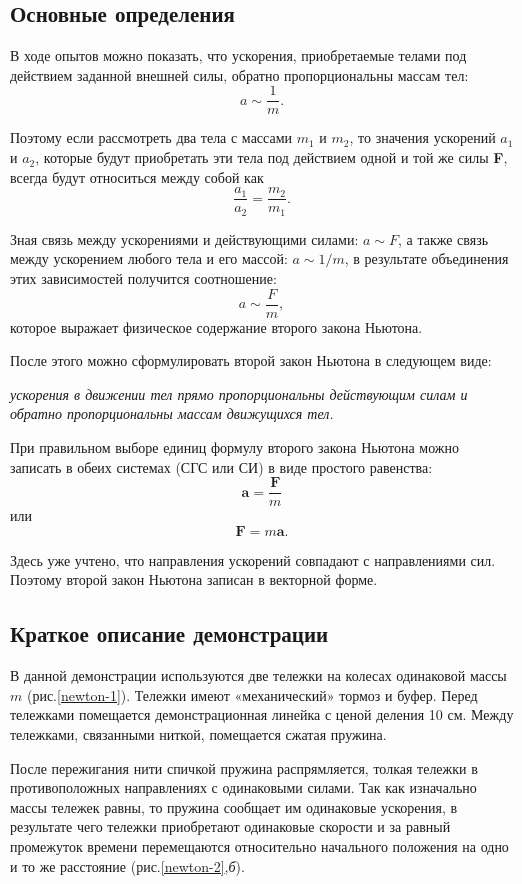 \documentclass[All.tex]{subfiles}
\begin{document}
\subsection*{\textcolor{PineGreen}{Основные определения}}

В ходе опытов можно показать, что ускорения, приобретаемые телами под действием заданной внешней силы, обратно пропорциональны массам тел: 
$$
a \sim \frac{1}{m}.
$$

Поэтому если рассмотреть два тела с массами $ m_1 $ и $ m_2 $, то значения ускорений $ a_1 $ и $ a_2 $, которые будут приобретать эти тела под действием одной и той же силы \textbf{F}, всегда будут относиться между собой как
$$
\frac{a_1}{a_2} = \frac{m_2}{m_1}.
$$

Зная связь между ускорениями и действующими силами: $ a \sim F $, а также связь между ускорением любого тела и его массой: $ a \sim 1/m$, в результате объединения этих зависимостей получится соотношение:
$$
a \sim \frac{F}{m},
$$
которое выражает физическое содержание второго закона Ньютона. 

После этого можно сформулировать второй закон Ньютона в 
следующем виде: 

\begin{flushleft}
	\textit{ускорения в движении тел прямо пропорциональны действующим 
силам и обратно пропорциональны массам движущихся тел. }
\end{flushleft}

При правильном выборе единиц формулу второго закона Ньютона 
можно записать в обеих системах (СГС или СИ) в виде простого равенства:
$$
 \textbf{a} = \frac{\textbf{F}}{m}
$$
 или
$$
\textbf{F} = m\textbf{a}.
$$
 
Здесь уже учтено, что направления ускорений совпадают с направлениями сил.
Поэтому второй закон Ньютона записан в векторной форме.

\subsection*{\textcolor{PineGreen}{Краткое описание демонстрации}}

В данной демонстрации используются две тележки на колесах одинаковой массы $m$ (рис.\ref{newton-1}).
Тележки имеют «механический» тормоз и буфер.
Перед тележками помещается демонстрационная линейка с ценой деления 10 см.
Между тележками, связанными ниткой, помещается сжатая пружина.

После пережигания нити спичкой пружина распрямляется, толкая тележки в противоположных направлениях с одинаковыми силами.
Так как изначально массы тележек равны, то пружина сообщает им одинаковые ускорения, в результате чего тележки приобретают одинаковые скорости и за равный промежуток времени перемещаются относительно начального положения на одно и то же расстояние (рис.\ref{newton-2},\textit{б}).      
\end{document}
